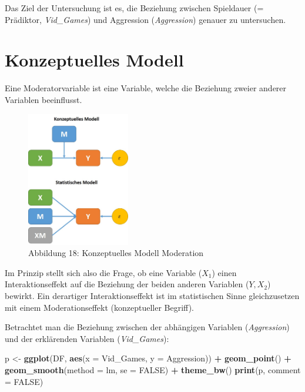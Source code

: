 \documentclass[]{article}
\newenvironment{Shaded}{\begin{snugshade}}{\end{snugshade}}
\newcommand{\DataTypeTok}[1]{\textcolor[rgb]{0.13,0.29,0.53}{#1}}
\newcommand{\KeywordTok}[1]{\textcolor[rgb]{0.13,0.29,0.53}{\textbf{#1}}}
\newcommand{\NormalTok}[1]{#1}
\newcommand{\OperatorTok}[1]{\textcolor[rgb]{0.81,0.36,0.00}{\textbf{#1}}}
\newcommand{\OtherTok}[1]{\textcolor[rgb]{0.56,0.35,0.01}{#1}}
\newcommand{\StringTok}[1]{\textcolor[rgb]{0.31,0.60,0.02}{#1}}
\begin{document}
Das Ziel der Untersuchung ist es, die Beziehung zwischen Spieldauer (= Prädiktor, \emph{Vid\_Games}) und Aggression (\emph{Aggression}) genauer zu untersuchen.

\hypertarget{konzeptuelles-modell}{%
\section*{Konzeptuelles Modell}\label{konzeptuelles-modell}}

Eine Moderatorvariable ist eine Variable, welche die Beziehung zweier anderer Variablen beeinflusst.

\begin{figure}
\centering
\includegraphics[width=0.4\textwidth,height=\textheight]{Images/ModeratorModell.jpg}
\caption{Abbildung 18: Konzeptuelles Modell Moderation}
\end{figure}

Im Prinzip stellt sich also die Frage, ob eine Variable (\(X_1\)) einen Interaktionseffekt auf die Beziehung der beiden anderen Variablen (\(Y, X_2\)) bewirkt. Ein derartiger Interaktionseffekt ist im statistischen Sinne gleichzusetzen mit einem Moderationseffekt (konzeptueller Begriff).

Betrachtet man die Beziehung zwischen der abhängigen Variablen (\emph{Aggression}) und der erklärenden Variablen (\emph{Vid\_Games}):

\begin{Shaded}
\begin{Highlighting}[]
\NormalTok{    p <-}\StringTok{ }\KeywordTok{ggplot}\NormalTok{(DF, }\KeywordTok{aes}\NormalTok{(}\DataTypeTok{x =}\NormalTok{ Vid_Games, }\DataTypeTok{y =}\NormalTok{ Aggression)) }\OperatorTok{+}\StringTok{ }
\StringTok{        }\KeywordTok{geom_point}\NormalTok{() }\OperatorTok{+}\StringTok{ }
\StringTok{        }\KeywordTok{geom_smooth}\NormalTok{(}\DataTypeTok{method =}\NormalTok{ lm, }\DataTypeTok{se =} \OtherTok{FALSE}\NormalTok{) }\OperatorTok{+}
\StringTok{        }\KeywordTok{theme_bw}\NormalTok{()}
    \KeywordTok{print}\NormalTok{(p, }\DataTypeTok{comment =} \OtherTok{FALSE}\NormalTok{)}
\end{Highlighting}
\end{Shaded}
\end{document}
